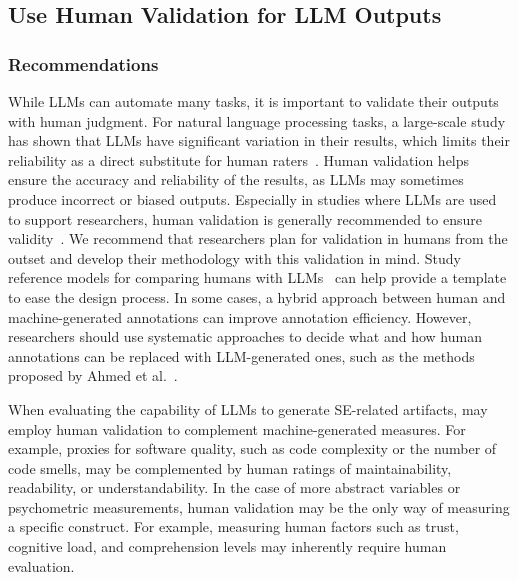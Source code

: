 



\subsection{Use Human Validation for LLM Outputs}

\subsubsection{Recommendations}

While LLMs can automate many tasks, it is important to validate their outputs with human judgment.
For natural language processing tasks, a large-scale study has shown that LLMs have significant variation in their results, which limits their reliability as a direct substitute for human raters~\cite{DBLP:journals/corr/abs-2406-18403}. 
Human validation helps ensure the accuracy and reliability of the results, as LLMs may sometimes produce incorrect or biased outputs.
Especially in studies where LLMs are used to support researchers, human validation is generally recommended to ensure validity~\cite{DBLP:conf/chi/Wang0RMM24}.
We recommend that researchers plan for validation in humans from the outset and develop their methodology with this validation in mind.
Study reference models for comparing humans with LLMs~\cite{Schneider2025ReferenceModel} can help provide a template to ease the design process.
In some cases, a hybrid approach between human and machine-generated annotations can improve annotation efficiency.
However, researchers should use systematic approaches to decide what and how human annotations can be replaced with LLM-generated ones, such as the methods proposed by Ahmed et al.~\cite{DBLP:journals/corr/abs-2408-05534}. 

When evaluating the capability of LLMs to generate SE-related artifacts, may employ human validation to complement machine-generated measures.
For example, proxies for software quality, such as code complexity or the number of code smells, may be complemented by human ratings of maintainability, readability, or understandability.
In the case of more abstract variables or psychometric measurements, human validation may be the only way of measuring a specific construct.
For example, measuring human factors such as trust, cognitive load, and comprehension levels may inherently require human evaluation.

